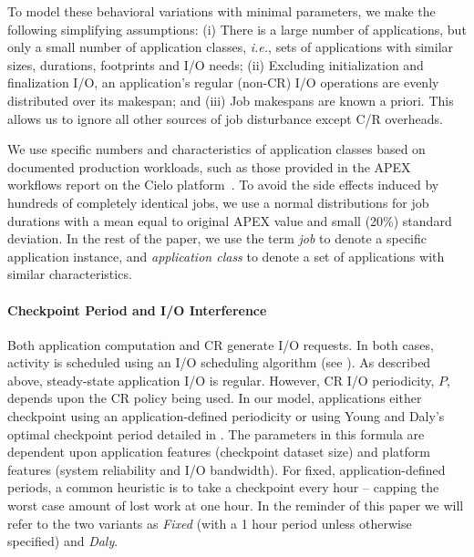 \documentclass[conference,nofonttune]{IEEEtran}
\newcommand{\ie}[0]{\emph{i.e.}\xspace}
\begin{document}
To model these behavioral variations with minimal parameters, we make the following
simplifying assumptions: (i) There is a large number of applications, but only a small number of application
  classes, \ie, sets of applications with similar sizes, durations, footprints and
  I/O needs; (ii) Excluding initialization and finalization I/O, an application's regular
  (non-CR) I/O operations are evenly distributed over its makespan; and (iii) Job makespans are known a priori. This allows us to ignore all other
  sources of job disturbance except C/R overheads.

We use specific numbers and characteristics of application classes based on
documented production workloads, such as those provided in the APEX workflows report
on the Cielo platform~\cite{apex2016}.  To avoid the side effects induced by
hundreds of completely identical jobs, we use a normal distributions for job
durations with a mean equal to original APEX value and small (20\%) standard
deviation.  In the rest of the paper, we use the term \emph{job} to denote
a specific application instance, and \emph{application class} to denote a set
of applications with similar characteristics.

\paragraph*{Checkpoint Period and I/O Interference}

Both application computation and CR generate I/O requests.  In both cases, activity
is scheduled using an I/O scheduling algorithm (see ). As
described above, steady-state application I/O is regular. However, CR I/O
periodicity, $P$, depends upon the CR policy being used.  In our model, applications
either checkpoint using an application-defined periodicity or using Young and
Daly's~\cite{young74,daly04} optimal checkpoint period detailed in
. The parameters in this formula are dependent
upon application features (checkpoint dataset size) and platform features (system
reliability and I/O bandwidth).  For fixed, application-defined periods, a common
heuristic is to take a checkpoint every hour -- capping the worst case amount of lost
work at one hour.  In the reminder of this paper we will refer to the two variants as
\emph{Fixed} (with a 1 hour period unless otherwise specified) and \emph{Daly}.
\end{document}
